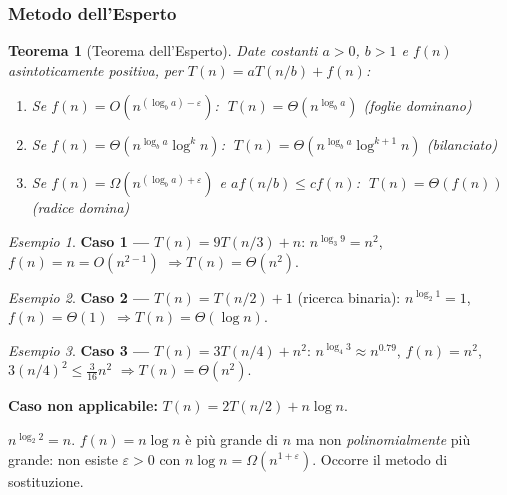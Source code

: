 \documentclass[a4paper, 11pt]{article}
\newtheorem{teorema}{Teorema}[section]
\theoremstyle{definition}
\theoremstyle{remark}
\newtheorem{esempio}{Esempio}[section]
\theoremstyle{remark}
\begin{document}
	\subsubsection{Metodo dell'Esperto}
	
	\begin{teorema}[Teorema dell'Esperto]
		Date costanti $a>0$, $b>1$ e $f(n)$ asintoticamente positiva,
		per $T(n) = aT(n/b) + f(n)$:
		
		\begin{enumerate}
			\item Se $f(n) = O(n^{(\log_b a)-\varepsilon})$:
			$\;T(n) = \Theta(n^{\log_b a})$
			\hfill\textit{(foglie dominano)}
			
			\item Se $f(n) = \Theta(n^{\log_b a}\log^k n)$:
			$\;T(n) = \Theta(n^{\log_b a}\log^{k+1} n)$
			\hfill\textit{(bilanciato)}
			
			\item Se $f(n) = \Omega(n^{(\log_b a)+\varepsilon})$
			e $af(n/b)\le cf(n)$:
			$\;T(n) = \Theta(f(n))$
			\hfill\textit{(radice domina)}
		\end{enumerate}
	\end{teorema}
	
	\begin{esempio}
		\textbf{Caso 1 —} $T(n) = 9T(n/3) + n$:
		$n^{\log_3 9} = n^2$, $f(n)=n=O(n^{2-1})$ $\Rightarrow T(n)=\Theta(n^2)$.
	\end{esempio}
	
	\begin{esempio}
		\textbf{Caso 2 —} $T(n) = T(n/2) + 1$ (ricerca binaria):
		$n^{\log_2 1}=1$, $f(n)=\Theta(1)$ $\Rightarrow T(n)=\Theta(\log n)$.
	\end{esempio}
	
	\begin{esempio}
		\textbf{Caso 3 —} $T(n) = 3T(n/4) + n^2$:
		$n^{\log_4 3}\approx n^{0.79}$, $f(n)=n^2$, $3(n/4)^2 \le \tfrac{3}{16}n^2$
		$\Rightarrow T(n)=\Theta(n^2)$.
	\end{esempio}
	
	\begin{hardnote}
		\textbf{Caso non applicabile:} $T(n) = 2T(n/2) + n\log n$.
		
		$n^{\log_2 2}=n$. $f(n)=n\log n$ è più grande di $n$ ma non
		\textit{polinomialmente} più grande: non esiste $\varepsilon>0$
		con $n\log n = \Omega(n^{1+\varepsilon})$. Occorre il metodo
		di sostituzione.
	\end{hardnote}
	
\end{document}
